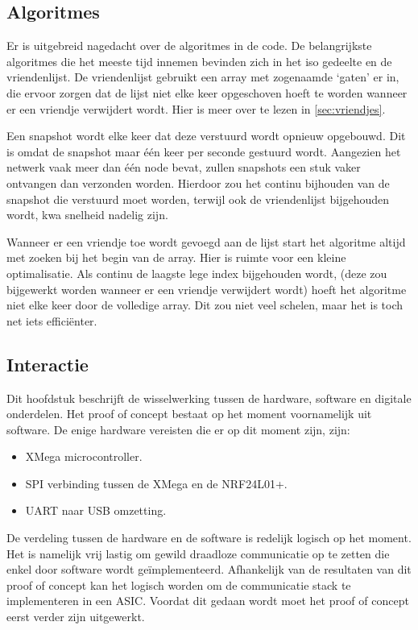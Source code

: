 \subsection{Algoritmes}

Er is uitgebreid nagedacht over de algoritmes in de code. De belangrijkste algoritmes die het meeste tijd innemen bevinden zich in het iso gedeelte en de vriendenlijst. De vriendenlijst gebruikt een array met zogenaamde `gaten' er in, die ervoor zorgen dat de lijst niet elke keer opgeschoven hoeft te worden wanneer er een vriendje verwijdert wordt. Hier is meer over te lezen in \autoref{sec:vriendjes}.

Een snapshot wordt elke keer dat deze verstuurd wordt opnieuw opgebouwd. Dit is omdat de snapshot maar één keer per seconde gestuurd wordt. Aangezien het netwerk vaak meer dan één node bevat, zullen snapshots een stuk vaker ontvangen dan verzonden worden. Hierdoor zou het continu bijhouden van de snapshot die verstuurd moet worden, terwijl ook de vriendenlijst bijgehouden wordt, kwa snelheid nadelig zijn.

Wanneer er een vriendje toe wordt gevoegd aan de lijst start het algoritme altijd met zoeken bij het begin van de array. Hier is ruimte voor een kleine optimalisatie. Als continu de laagste lege index bijgehouden wordt, (deze zou bijgewerkt worden wanneer er een vriendje verwijdert wordt) hoeft het algoritme niet elke keer door de volledige array. Dit zou niet veel schelen, maar het is toch net iets efficiënter.


\subsection{Interactie}

Dit hoofdstuk beschrijft de wisselwerking tussen de hardware, software en digitale onderdelen. Het proof of concept bestaat op het moment voornamelijk uit software. De enige hardware vereisten die er op dit moment zijn, zijn:
\begin{itemize}
    \item XMega microcontroller.
    \item SPI verbinding tussen de XMega en de NRF24L01+.
    \item UART naar USB omzetting.
\end{itemize}
De verdeling tussen de hardware en de software is redelijk logisch op het moment. Het is namelijk vrij lastig om gewild draadloze communicatie op te zetten die enkel door software wordt geïmplementeerd. Afhankelijk van de resultaten van dit proof of concept kan het logisch worden om de communicatie stack te implementeren in een ASIC. Voordat dit gedaan wordt moet het proof of concept eerst verder zijn uitgewerkt.


